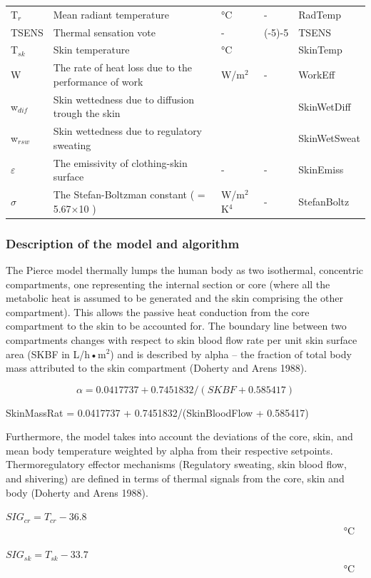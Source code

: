 \begin{longtable}[c]{p{1.2in}p{2.0in}p{0.8in}p{0.8in}p{1.2in}}
T\(_{r}\) & Mean radiant temperature & °C & - & RadTemp \tabularnewline
TSENS & Thermal sensation vote & - & (-5)-5 & TSENS \tabularnewline
T\(_{sk}\) & Skin temperature & °C & ~ & SkinTemp \tabularnewline
W & The rate of heat loss due to the performance of work & W/m\(^{2}\) & - & WorkEff \tabularnewline
w\(_{dif}\) & Skin wettedness due to diffusion trough the skin & ~ & ~ & SkinWetDiff \tabularnewline
w\(_{rsw}\) & Skin wettedness due to regulatory sweating & ~ & ~ & SkinWetSweat \tabularnewline
$\varepsilon$ & The emissivity of clothing-skin surface & - & - & SkinEmiss \tabularnewline
$\sigma$ & The Stefan-Boltzman constant ( = 5.67×10  ) & W/m\(^{2}\)K\(^{4}\) & - & StefanBoltz \tabularnewline
\bottomrule
\end{longtable}

\subsubsection{Description of the model and algorithm}\label{description-of-the-model-and-algorithm-1}

The Pierce model thermally lumps the human body as two isothermal, concentric compartments, one representing the internal section or core (where all the metabolic heat is assumed to be generated and the skin comprising the other compartment). This allows the passive heat conduction from the core compartment to the skin to be accounted for. The boundary line between two compartments changes with respect to skin blood flow rate per unit skin surface area (SKBF in L/h•m\(^{2}\)) and is described by alpha -- the fraction of total body mass attributed to the skin compartment (Doherty and Arens 1988).

\begin{equation}
\alpha  = 0.0417737 + 0.7451832/(SKBF + 0.585417)
\end{equation}

SkinMassRat = 0.0417737 + 0.7451832/(SkinBloodFlow + 0.585417)

Furthermore, the model takes into account the deviations of the core, skin, and mean body temperature weighted by alpha from their respective setpoints. Thermoregulatory effector mechanisms (Regulatory sweating, skin blood flow, and shivering) are defined in terms of thermal signals from the core, skin and body (Doherty and Arens 1988).

\(SI{G_{cr}} = {T_{cr}} - 36.8\) ~~~~~~~~~~~~~~~~~~~~~~~~~~~~~~~~~~~~~~~~~~~~~~~~~~~~~~~~~~~~~~~~~~~ °C

\(SI{G_{sk}} = {T_{sk}} - 33.7\) ~~~~~~~~~~~~~~~~~~~~~~~~~~~~~~~~~~~~~~~~~~~~~~~~~~~~~~~~~~~~~~~~~~~ °C

